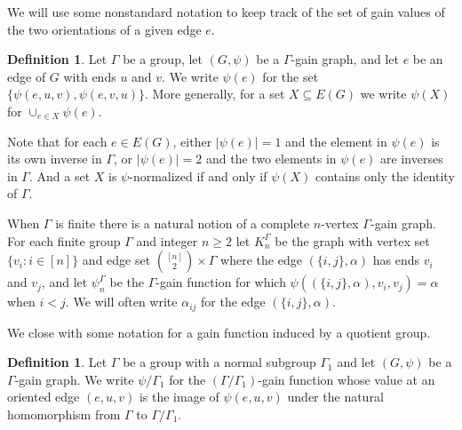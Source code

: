 \documentclass[12pt]{article}
\theoremstyle{definition}
\newtheorem{definition}[theorem]{Definition}
\begin{document}
We will use some nonstandard notation to keep track of the set of gain values of the two orientations of a given edge $e$.

\begin{definition} \label{def: set of gain values}
Let $\Gamma$ be a group, let $(G, \psi)$ be a $\Gamma$-gain graph, and let $e$ be an edge of $G$ with ends $u$ and $v$.
We write $\psi(e)$ for the set $\{\psi(e, u, v), \psi(e, v, u)\}$.
More generally, for a set $X \subseteq E(G)$ we write $\psi(X)$ for $\cup_{e \in X} \psi(e)$.
\end{definition}

Note that for each $e \in E(G)$, either $|\psi(e)| = 1$ and the element in $\psi(e)$ is its own inverse in $\Gamma$, or $|\psi(e)| = 2$ and the two elements in $\psi(e)$ are inverses in $\Gamma$.
And a set $X$ is $\psi$-normalized if and only if $\psi(X)$ contains only the identity of $\Gamma$.


When $\Gamma$ is finite there is a natural notion of a complete $n$-vertex $\Gamma$-gain graph.
For each finite group $\Gamma$ and integer $n \ge 2$ let $K_n^{\Gamma}$ be the graph with vertex set $\{v_i \colon i \in [n]\}$ and edge set $\binom{[n]}{2} \times \Gamma$ where the edge $(\{i,j\}, \alpha)$ has ends $v_i$ and $v_j$, and let $\psi_n^{\Gamma}$ be the $\Gamma$-gain function for which $\psi((\{i,j\}, \alpha), v_i, v_j) = \alpha$  when $i < j$.
We will often write $\alpha_{ij}$ for the edge $(\{i,j\}, \alpha)$.


We close with some notation for a gain function induced by a quotient group.

\begin{definition} \label{def: quotient group induced gain function}
Let $\Gamma$ be a group with a normal subgroup $\Gamma_1$ and let $(G,\psi)$ be a $\Gamma$-gain graph.
We write $\psi/{\Gamma_1}$ for the $(\Gamma/\Gamma_1)$-gain function whose value at an oriented edge $(e,u,v)$ is the image of $\psi(e,u,v)$ under the natural homomorphism from $\Gamma$ to $\Gamma/\Gamma_1$. 
\end{definition}
\end{document}

